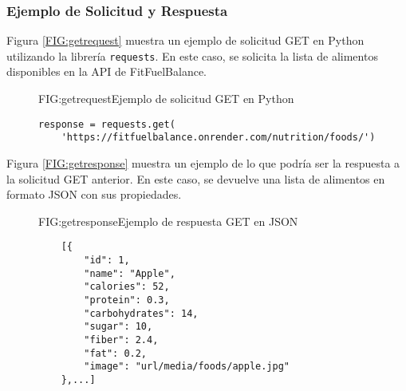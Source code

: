 \subsubsection{Ejemplo de Solicitud y Respuesta}
Figura \ref{FIG:getrequest} muestra un ejemplo de solicitud GET en Python utilizando la librería \texttt{requests}. En este caso, se solicita la lista de alimentos disponibles en la API de FitFuelBalance.
\begin{figure}[Ejemplo Solicitud GET]{FIG:getrequest}{Ejemplo de solicitud GET en Python}
\begin{verbatim}
response = requests.get(
    'https://fitfuelbalance.onrender.com/nutrition/foods/')
\end{verbatim}
\end{figure}

Figura \ref{FIG:getresponse} muestra un ejemplo de lo que podría ser la respuesta a la solicitud GET anterior. En este caso, se devuelve una lista de alimentos en formato JSON con sus propiedades.

\begin{figure}[Ejemplo Respuesta GET]{FIG:getresponse}{Ejemplo de respuesta GET en JSON}
\begin{verbatim}
    [{
        "id": 1,
        "name": "Apple",
        "calories": 52,
        "protein": 0.3,
        "carbohydrates": 14,
        "sugar": 10,
        "fiber": 2.4,
        "fat": 0.2,
        "image": "url/media/foods/apple.jpg"
    },...]
\end{verbatim}
\end{figure}